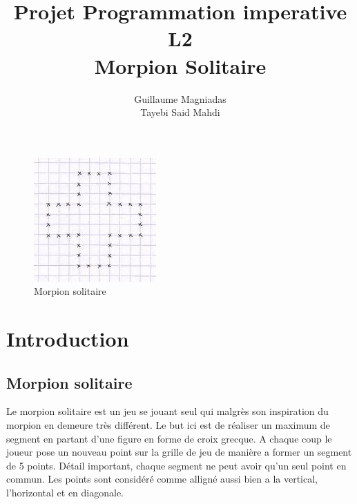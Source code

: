 \documentclass[11pt]{article}
\title{\textbf{Projet Programmation imperative L2}\\ Morpion Solitaire}
\author{Guillaume Magniadas\\
		Tayebi Said Mahdi
		}
\date{}
\begin{document}
\maketitle
\begin{figure}[htp]
\centering
\includegraphics[scale=1.00]{index.jpg}
\caption{Morpion solitaire}

\label{}
\end{figure}

\newpage
\tableofcontents
\newpage

	\section{Introduction}
	\subsection{Morpion solitaire }


Le morpion solitaire est un jeu se jouant seul  qui malgrès son inspiration du morpion en demeure très différent. Le but ici est de réaliser un maximum de segment en partant d'une figure en forme de croix grecque. A chaque coup le joueur pose un nouveau point sur la grille de jeu de manière a former un segment de 5 points. Détail important, chaque segment ne peut avoir qu'un seul point en commun. Les points sont considéré comme alligné aussi bien a la vertical, l'horizontal et en diagonale.
\end{document}
